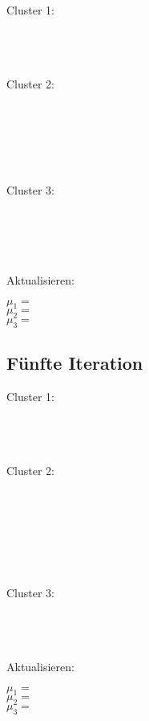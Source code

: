 Cluster 1:

\mat[1,6]\\
\mat[1,5]\\
\mat[1,4]\\

Cluster 2:

\mat[3,2]\\
\mat[3,3]\\
\mat[4,1]\\
\mat[5,1]\\
\mat[6,2]\\

Cluster 3:

\mat[6,3]\\
\mat[8,4]\\
\mat[8,5]\\
\mat[8,6]\\

Aktualisieren:

$\mu_1 = $\mat[1, 5]\\
$\mu_2 = $\mat[21/5, 10/5]\\
$\mu_3 = $\mat[30/4, 18/4]\\


\subsection{Fünfte Iteration}

Cluster 1:

\mat[1,6]\\
\mat[1,5]\\
\mat[1,4]\\

Cluster 2:

\mat[3,2]\\
\mat[3,3]\\
\mat[4,1]\\
\mat[5,1]\\
\mat[6,3]\\
\mat[6,2]\\

Cluster 3:

\mat[8,4]\\
\mat[8,5]\\
\mat[8,6]\\

Aktualisieren:

$\mu_1 = $\mat[1, 5]\\
$\mu_2 = $\mat[27/6, 12/6]\\
$\mu_3 = $\mat[24/3, 15/3]\\